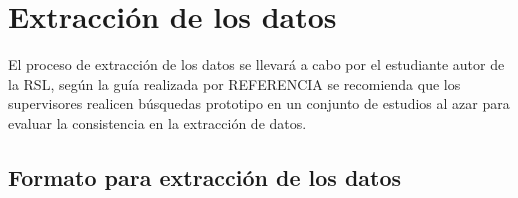 \documentclass{article}
\begin{document}
\begin{center}
\begin{table}[ht]
        \caption{Calidad} 
        \centering 
        \label{table:tablacalidad}
\end{table}
\end{center}

\newpage

\section{Extracción de los datos}
El proceso de extracción de los datos se llevará a cabo por el estudiante autor de la RSL, según la guía realizada por REFERENCIA 
se recomienda que los supervisores realicen búsquedas prototipo en un conjunto de estudios al azar para evaluar la consistencia
en la extracción de datos.

\subsection{Formato para extracción de los datos}
\end{document}
